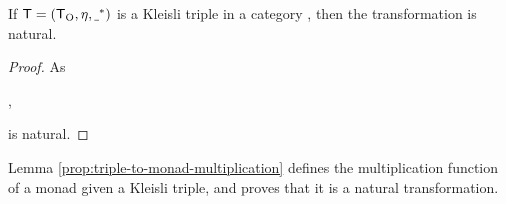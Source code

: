 \begin{proposition}
  \label{prop:triple-to-monad-unit}
  If $\mathsf{T} = (\mathsf{T}_{\operatorname{O}}, \eta, \underline{~}^*)$ is a Kleisli triple in
  a category , then the transformation \nat{\eta} is natural.
  \begin{proof}
    As
    \begin{steps}
      ,
    \end{steps}
    \nat{\eta} is natural.
  \end{proof}
\end{proposition}

Lemma \ref{prop:triple-to-monad-multiplication} defines the
multiplication function of a monad given a Kleisli triple, and proves that it
is a natural transformation.

